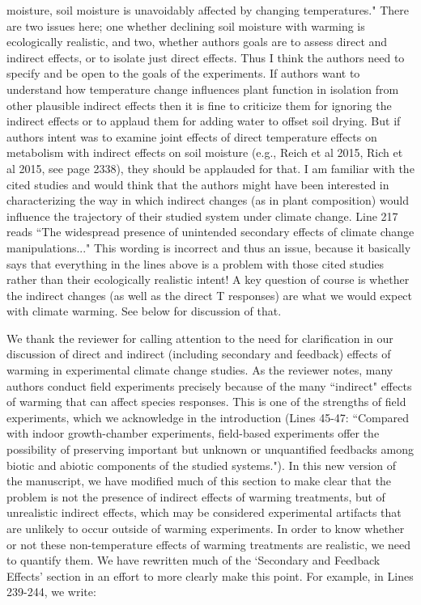 \documentclass[11pt,a4paper]{letter}
\begin{document}
\begin{letter}{}
{moisture, soil moisture is unavoidably affected by changing temperatures." There are two issues here; one whether declining soil moisture with warming is ecologically
realistic, and two, whether authors goals are to assess direct and indirect effects, or to isolate
just direct effects. Thus I think the authors need to specify and be open to the goals of the
experiments. If authors want to understand how temperature change influences plant function
in isolation from other plausible indirect effects then it is fine to criticize them for ignoring the
indirect effects or to applaud them for adding water to offset soil drying. But if authors intent
was to examine joint effects of direct temperature effects on metabolism with indirect effects
on soil moisture (e.g., Reich et al 2015, Rich et al 2015, see page 2338), they should be
applauded for that. I am familiar with the cited studies and would think that the authors might
have been interested in characterizing the way in which indirect changes (as in plant
composition) would influence the trajectory of their studied system under climate change.
Line 217 reads ``The widespread presence of unintended secondary effects of climate change
manipulations..." This wording is incorrect and thus an issue, because it basically says that everything in the lines
above is a problem with those cited studies rather than their ecologically realistic intent! A key
question of course is whether the indirect changes (as well as the direct T responses) are what
we would expect with climate warming. See below for discussion of that.}
\\
\par We thank the reviewer for calling attention to the need for clarification in our discussion of direct and indirect (including secondary and feedback) effects of warming in experimental climate change studies. As the reviewer notes, many authors conduct field experiments precisely because of the many ``indirect" effects of warming that can affect species responses. This is one of the strengths of field experiments, which we acknowledge in the introduction (Lines 45-47: ``Compared with indoor growth-chamber experiments, field-based experiments offer the possibility of preserving important but unknown or unquantified feedbacks among biotic and abiotic components of the studied systems."). In this new version of the manuscript, we have modified much of this section to make clear that the problem is not the presence of indirect effects of warming treatments, but of unrealistic indirect effects, which may be considered experimental artifacts that are unlikely to occur outside of warming experiments. In order to know whether or not these non-temperature effects of warming treatments are realistic, we need to quantify them. We have rewritten much of the `Secondary and Feedback Effects' section in an effort to more clearly make this point. For example, in Lines 239-244, we write:

\end{letter}
\end{document}
